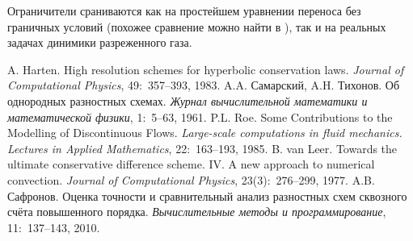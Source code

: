 \documentclass[a4paper,12pt]{article}
\begin{document}
Ограничители сраниваются как на простейшем уравнении переноса без граничных условий (похожее сравнение можно найти в \cite{Safronov2010}), 
так и на реальных задачах динимики разреженного газа.

\begin{thebibliography}{9}
	A. Harten. High resolution schemes for hyperbolic conservation laws.
	{\it Journal of Computational Physics},
	49:~357--393, 1983.
	A.A. Самарский, A.H. Тихонов. Об однородных разностных схемах.
	{\it Журнал вычислительной математики и математической физики},
	1:~5--63, 1961.
	P.L. Roe. Some Contributions to the Modelling of Discontinuous Flows.
	{\it Large-scale computations in fluid mechanics. Lectures in Applied Mathematics},
	22:~163--193, 1985.
	B. van Leer. Towards the ultimate conservative difference scheme. IV. A new approach to numerical convection.
	{\it Journal of Computational Physics},
	23(3):~276--299, 1977.
	A.B. Сафронов. Оценка точности и сравнительный анализ разностных схем сквозного счёта повышенного порядка.
	{\it Вычислительные методы и программирование},
	11:~137--143, 2010.

\end{thebibliography}
\end{document}
